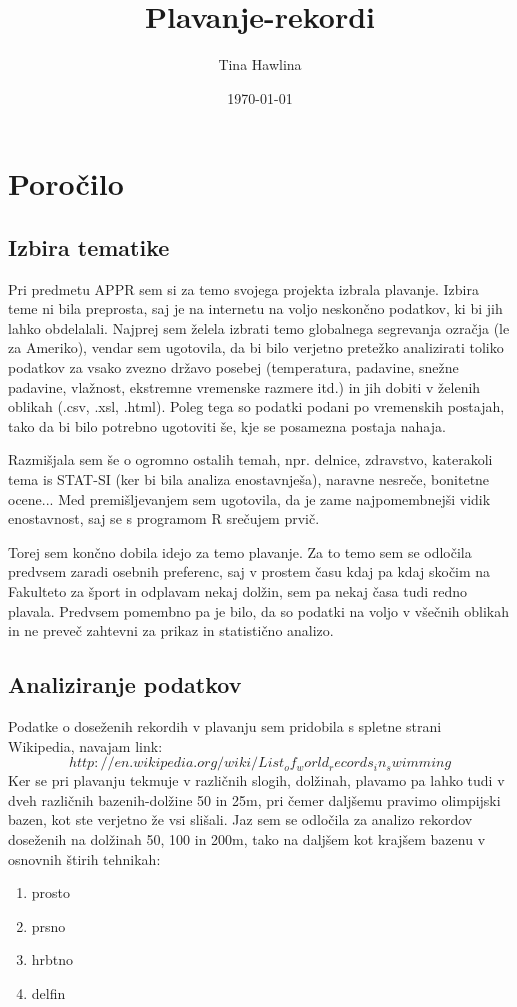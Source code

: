 \documentclass[10pt]{article}
\date{\today}
\title{Plavanje-rekordi}
\author{Tina Hawlina}
\begin{document}
\maketitle

\section{Poročilo}

\subsection{Izbira tematike}

Pri predmetu APPR sem si za temo svojega projekta izbrala plavanje. Izbira teme ni bila preprosta, saj je na internetu na voljo neskončno podatkov, ki bi jih lahko obdelalali. Najprej sem želela izbrati temo globalnega segrevanja ozračja (le za Ameriko), vendar sem ugotovila, da bi bilo verjetno pretežko analizirati toliko podatkov za vsako zvezno državo posebej (temperatura, padavine, snežne padavine, vlažnost, ekstremne vremenske razmere itd.) in jih dobiti v želenih oblikah (.csv, .xsl, .html). Poleg tega so podatki podani po vremenskih postajah, tako da bi bilo potrebno ugotoviti še, kje se posamezna postaja nahaja.

Razmišjala sem še o ogromno ostalih temah, npr. delnice, zdravstvo, katerakoli tema is STAT-SI (ker bi bila analiza enostavnješa), naravne nesreče, bonitetne ocene... Med premišljevanjem sem ugotovila, da je zame najpomembnejši vidik enostavnost, saj se s programom R srečujem prvič.

Torej sem končno dobila idejo za temo plavanje. Za to temo sem se odločila predvsem zaradi osebnih preferenc, saj v prostem času kdaj pa kdaj skočim na Fakulteto za šport in odplavam nekaj dolžin, sem pa nekaj časa tudi redno plavala. Predvsem pomembno pa je bilo, da so podatki na voljo v všečnih oblikah in ne preveč zahtevni za prikaz in statistično analizo. 


\subsection{Analiziranje podatkov}

Podatke o doseženih rekordih v plavanju sem pridobila s spletne strani Wikipedia, navajam link:
$$http://en.wikipedia.org/wiki/List_of_world_records_in_swimming$$
Ker se pri plavanju tekmuje v različnih slogih, dolžinah, plavamo pa lahko tudi v dveh različnih bazenih-dolžine 50 in 25m, pri čemer daljšemu pravimo olimpijski bazen, kot ste verjetno že vsi slišali. Jaz sem se odločila za analizo rekordov doseženih na dolžinah 50, 100 in 200m, tako na daljšem kot krajšem bazenu v osnovnih štirih tehnikah:
\begin{enumerate}
\item prosto
\item prsno
\item hrbtno
\item delfin
\end{enumerate}
\end{document}
